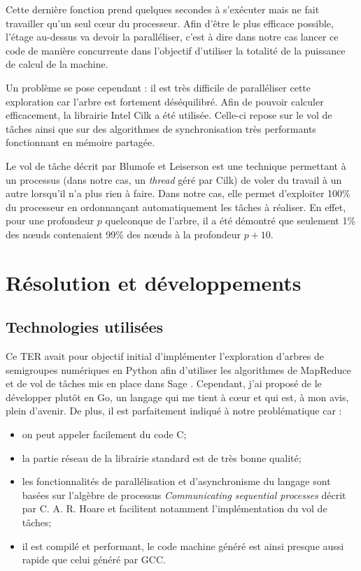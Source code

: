 \documentclass[12pt,a4paper]{report}
\begin{document}
Cette dernière fonction prend quelques secondes à s'exécuter mais ne fait travailler qu'un seul c\oe{}ur du processeur. Afin d'être le plus efficace possible, l'étage au-dessus va devoir la paralléliser, c'est à dire dans notre cas lancer ce code de manière concurrente dans l'objectif d'utiliser la totalité de la puissance de calcul de la machine.

Un problème se pose cependant : il est très difficile de paralléliser cette exploration car l'arbre est fortement déséquilibré. Afin de pouvoir calculer efficacement, la librairie Intel Cilk a été utilisée. Celle-ci repose sur le vol de tâches ainsi que sur des algorithmes de synchronisation très performants \cite{cilk} fonctionnant en mémoire partagée.

Le vol de tâche décrit par Blumofe et Leiserson \cite{work-stealing} est une technique permettant à un processus (dans notre cas, un \emph{thread} géré par Cilk) de voler du travail à un autre lorsqu'il n'a plus rien à faire. Dans notre cas, elle permet d'exploiter 100\% du processeur en ordonnançant automatiquement les tâches à réaliser. En effet, pour une profondeur $p$ quelconque de l'arbre, il a été démontré que seulement 1\% des n\oe{}uds contenaient 99\% des n\oe{}uds à la profondeur $p + 10$.

\chapter{Résolution et développements}

\section{Technologies utilisées}
Ce TER avait pour objectif initial d'implémenter l'exploration d'arbres de semigroupes numériques en Python afin d'utiliser les algorithmes de MapReduce et de vol de tâches mis en place dans Sage \cite{fh-hpc}. Cependant, j'ai proposé de le développer plutôt en Go, un langage qui me tient à c\oe{}ur et qui est, à mon avis, plein d'avenir. De plus, il est parfaitement indiqué à notre problématique car :
\begin{itemize}
  \item	on peut appeler facilement du code C;
  \item	la partie réseau de la librairie standard est de très bonne qualité;
  \item	les fonctionnalités de parallélisation et d'asynchronisme du langage sont basées sur l'algèbre de processus \emph{Communicating sequential processes} décrit par C. A. R. Hoare \cite{csp} et facilitent notamment l'implémentation du vol de tâches;
  \item	il est compilé et performant, le code machine généré est ainsi presque aussi rapide que celui généré par GCC.
\end{itemize}
\end{document}
